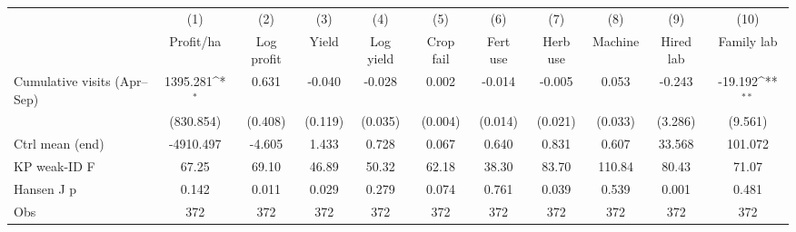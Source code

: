 {
\def\sym#1{\ifmmode^{#1}\else\(^{#1}\)\fi}
\begin{tabular}{l*{10}{c}}
\toprule
                    &\multicolumn{1}{c}{(1)}&\multicolumn{1}{c}{(2)}&\multicolumn{1}{c}{(3)}&\multicolumn{1}{c}{(4)}&\multicolumn{1}{c}{(5)}&\multicolumn{1}{c}{(6)}&\multicolumn{1}{c}{(7)}&\multicolumn{1}{c}{(8)}&\multicolumn{1}{c}{(9)}&\multicolumn{1}{c}{(10)}\\
                    &\multicolumn{1}{c}{Profit/ha}&\multicolumn{1}{c}{Log profit}&\multicolumn{1}{c}{Yield}&\multicolumn{1}{c}{Log yield}&\multicolumn{1}{c}{Crop fail}&\multicolumn{1}{c}{Fert use}&\multicolumn{1}{c}{Herb use}&\multicolumn{1}{c}{Machine}&\multicolumn{1}{c}{Hired lab}&\multicolumn{1}{c}{Family lab}\\
\midrule
Cumulative visits (Apr--Sep)&    1395.281\sym{*}  &       0.631         &      -0.040         &      -0.028         &       0.002         &      -0.014         &      -0.005         &       0.053         &      -0.243         &     -19.192\sym{**} \\
                    &   (830.854)         &     (0.408)         &     (0.119)         &     (0.035)         &     (0.004)         &     (0.014)         &     (0.021)         &     (0.033)         &     (3.286)         &     (9.561)         \\
\midrule
Ctrl mean (end)     &   -4910.497         &      -4.605         &       1.433         &       0.728         &       0.067         &       0.640         &       0.831         &       0.607         &      33.568         &     101.072         \\
KP weak-ID F        &       67.25         &       69.10         &       46.89         &       50.32         &       62.18         &       38.30         &       83.70         &      110.84         &       80.43         &       71.07         \\
Hansen J p          &       0.142         &       0.011         &       0.029         &       0.279         &       0.074         &       0.761         &       0.039         &       0.539         &       0.001         &       0.481         \\
Obs                 &         372         &         372         &         372         &         372         &         372         &         372         &         372         &         372         &         372         &         372         \\
\bottomrule
\end{tabular}
}
